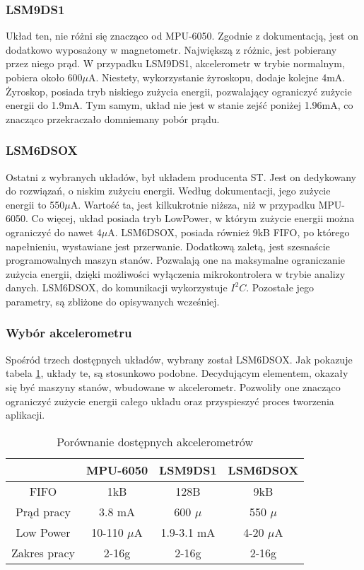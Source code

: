 \subsubsection{LSM9DS1}
Układ ten, nie różni się znacząco od MPU-6050. Zgodnie z dokumentacją, jest on dodatkowo wyposażony w magnetometr. Największą z różnic, jest pobierany przez niego prąd. W przypadku LSM9DS1, akcelerometr w trybie normalnym, pobiera około 600$\mu$A.\cite{LSM9DS1} Niestety, wykorzystanie żyroskopu, dodaje kolejne 4mA. Żyroskop, posiada tryb niskiego zużycia energii, pozwalający ograniczyć zużycie energii do 1.9mA. Tym samym, układ nie jest w stanie zejść poniżej 1.96mA, co znacząco przekraczało domniemany pobór prądu.

\subsubsection{LSM6DSOX}
Ostatni z wybranych układów, był układem producenta ST. Jest on dedykowany do rozwiązań, o niskim zużyciu energii. Według dokumentacji, jego zużycie energii to 550$\mu$A.\cite{LSM6DSOX} Wartość ta, jest kilkukrotnie niższa, niż w przypadku MPU-6050. Co więcej, układ posiada tryb LowPower, w którym zużycie energii można ograniczyć do nawet 4$\mu$A. LSM6DSOX, posiada również 9kB FIFO, po którego napełnieniu, wystawiane jest przerwanie. Dodatkową zaletą, jest szesnaście programowalnych maszyn stanów. Pozwalają one na maksymalne ograniczanie zużycia energii, dzięki możliwości wyłączenia mikrokontrolera w trybie analizy danych. LSM6DSOX, do komunikacji wykorzystuje $I^{2}C$. Pozostałe jego parametry, są zbliżone do opisywanych wcześniej.

\subsubsection{Wybór akcelerometru}
Spośród trzech dostępnych układów, wybrany został LSM6DSOX. Jak pokazuje tabela \ref{tab:accelerometer}, układy te, są stosunkowo podobne. Decydującym elementem, okazały się być maszyny stanów, wbudowane w akcelerometr. Pozwoliły one znacząco ograniczyć zużycie energii całego układu oraz przyspieszyć proces tworzenia aplikacji.

\begin{table}[h]
\centering
\begin{tabular}{|c | c | c | c|}
    \hline
     & MPU-6050 & LSM9DS1 & LSM6DSOX \\
    \hline
    FIFO & 1kB  &   128B  & 9kB \\
    \hline
    Prąd pracy  & 3.8 mA & 600 $\mu$ & 550 $\mu$ \\
    \hline
    Low Power & 10-110 $\mu$A & 1.9-3.1 mA & 4-20 $\mu$A\\
    \hline
    Zakres pracy & 2-16g & 2-16g & 2-16g\\
    \hline
\end{tabular}
\caption{Porównanie dostępnych akcelerometrów}
\label{tab:accelerometer}
\end{table}

